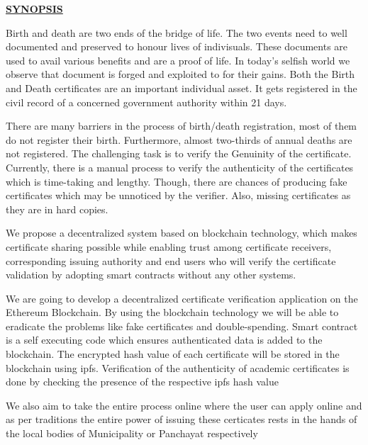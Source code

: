 
\begin{center}
    \underline{\bfseries \huge SYNOPSIS}\\
    \vspace{1cm}
    \end{center}
    Birth and death are two ends of the bridge of life. The two events need to well documented and preserved to honour lives of indivisuals. These documents are used to avail various benefits and are  a proof of life. In today's selfish world we observe that document is forged and exploited to for their gains. Both the Birth and Death certificates are an important individual asset. It gets registered in the civil record of a concerned government authority within 21 days. \newline

There are many barriers in the process of birth/death registration, most of them do  not register their birth. Furthermore, almost two-thirds of annual deaths are not registered. 
The challenging task is to verify the Genuinity of the certificate. Currently, there is a manual process to verify the authenticity of the certificates which is time-taking and lengthy. Though, there are chances of producing fake certificates which may be unnoticed by the verifier. Also, missing certificates as they are in hard copies.\newline
 
We  propose a decentralized system based on blockchain technology, which makes certificate sharing possible while enabling trust among certificate receivers, corresponding issuing authority and end users who will verify the certificate validation by adopting smart contracts without any other systems.\newline
 
We are going to develop a decentralized certificate verification application on the Ethereum Blockchain. By using the blockchain technology we will be able to eradicate the problems like fake certificates and double-spending.
Smart contract is a self executing code which ensures authenticated data is added to the blockchain.  The encrypted hash value of each certificate will be stored in the blockchain using ipfs. Verification of the authenticity of academic certificates is done by checking the presence of the respective ipfs hash value 
\newline
    
    We also aim to take the entire process online where the user can apply online and as per traditions the entire power of issuing these certicates rests in the hands of the local bodies of Municipality or Panchayat respectively
    
